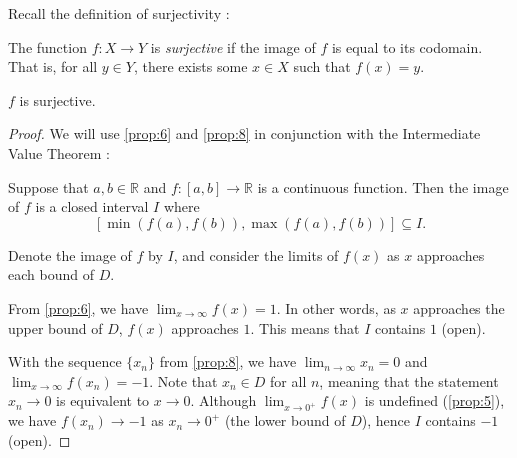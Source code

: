 \begin{enumerate}
\begin{enumerate}
                Recall the definition of surjectivity \parencite{surjective-function}:
                \begin{definition} \label{def:surjective}
                    The function $f: X \rightarrow Y$ is \emph{surjective} if the image of $f$ is equal to its codomain.
                    That is, for all $y \in Y$, there exists some $x \in X$ such that $f(x) = y$.
                \end{definition}

                \medskip

                \begin{proposition} \label{prop:9}
                    $f$ is surjective.
                \end{proposition}

                \begin{proof}
                    We will use \cref{prop:6} and \cref{prop:8} in conjunction with the Intermediate Value Theorem \parencite{ivt}:
                    \begin{theorem} \label{thm:ivt}
                        Suppose that $a, b \in \mathbb{R}$ and $f: [a, b] \rightarrow \mathbb{R}$ is a continuous function.
                        Then the image of $f$ is a closed interval $I$ where
                        \[ \left[\min(f(a), f(b)), \max(f(a), f(b))\right] \subseteq I. \]
                    \end{theorem}

                    Denote the image of $f$ by $I$, and consider the limits of $f(x)$ as $x$ approaches each bound of $D$.

                    \smallskip

                    From \cref{prop:6}, we have $\lim_{x \rightarrow \infty} f(x) = 1$.
                    In other words, as $x$ approaches the upper bound of $D$, $f(x)$ approaches $1$.
                    This means that $I$ contains $1$ (open).

                    With the sequence $\{x_n\}$ from \cref{prop:8}, we have $\lim_{n \rightarrow \infty} x_n = 0$ and $\lim_{x \rightarrow \infty} f(x_n) = -1$.
                    Note that $x_n \in D$ for all $n$, meaning that the statement $x_n \rightarrow 0$ is equivalent to $x \rightarrow 0$.
                    Although $\lim_{x \rightarrow 0^+} f(x)$ is undefined (\cref{prop:5}), we have $f(x_n) \rightarrow -1$ as $x_n \rightarrow 0^+$ (the lower bound of $D$), hence $I$ contains $-1$ (open).


\end{proof}
\end{enumerate}
\end{enumerate}
